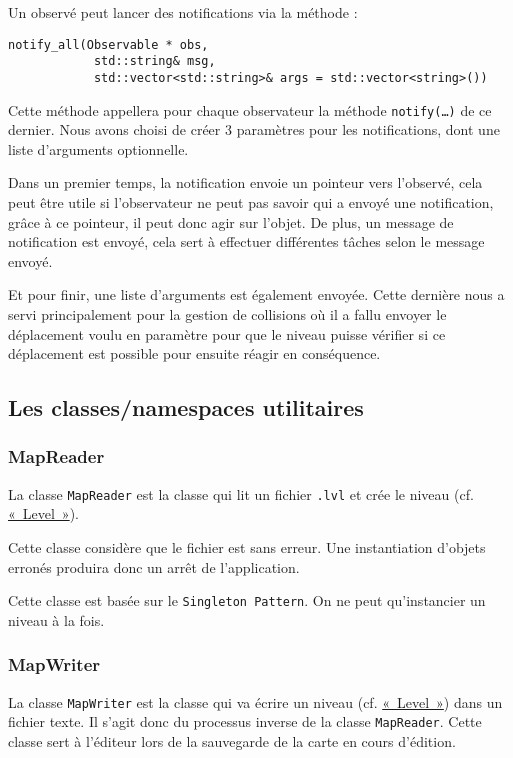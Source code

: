 \documentclass[]{report}
\begin{document}
Un observé peut lancer des notifications via la méthode :
\begin{lstlisting}
notify_all(Observable * obs, 
            std::string& msg, 
            std::vector<std::string>& args = std::vector<string>())
\end{lstlisting}

Cette méthode appellera pour chaque observateur la méthode \texttt{notify(\dots)} de ce dernier.
Nous avons choisi de créer 3 paramètres pour les notifications, dont une liste d'arguments optionnelle.

Dans un premier temps, la notification envoie un pointeur vers l'observé, cela peut être utile si l'observateur
ne peut pas savoir qui a envoyé une notification, grâce à ce pointeur, il peut donc agir sur l'objet. De plus, un message
de notification est envoyé, cela sert à effectuer différentes tâches selon le message envoyé.

Et pour finir, une liste d'arguments est également envoyée. Cette dernière nous a servi principalement pour la gestion
de collisions où il a fallu envoyer le déplacement voulu en paramètre pour que le niveau puisse vérifier si ce déplacement est
possible pour ensuite réagir en conséquence.

\subsection{Les classes/namespaces utilitaires}

\subsubsection{MapReader}

La classe \texttt{MapReader} est la classe qui lit un fichier \texttt{.lvl} 
et crée le niveau (cf. \hyperref[Level]{«~Level~»}).

Cette classe considère que le fichier est sans erreur. Une instantiation d'objets
erronés produira donc un arrêt de l'application.

Cette classe est basée sur le \texttt{Singleton Pattern}. On ne peut qu’instancier un niveau
à la fois.

\subsubsection{MapWriter}

La classe \texttt{MapWriter} est la classe qui va écrire un niveau (cf. \hyperref[Level]{«~Level~»}) 
dans un fichier texte. Il s’agit donc du processus inverse de la classe
\texttt{MapReader}. Cette classe sert à l’éditeur lors de la sauvegarde de la
carte en cours d’édition.
\end{document}
